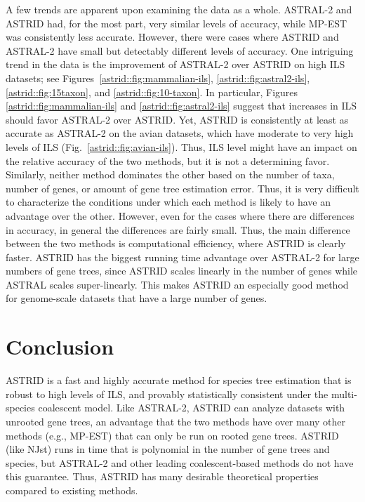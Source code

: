 A few trends are apparent upon examining the data as a whole. ASTRAL-2 
and ASTRID had, for the most part, very similar levels of accuracy,
while MP-EST was consistently less accurate.  However, there were cases 
where ASTRID and ASTRAL-2 have small but detectably different levels of
accuracy.
One intriguing trend in the data is the improvement of
ASTRAL-2 over ASTRID on high ILS datasets; see Figures~\ref{astrid::fig:mammalian-ils},
\ref{astrid::fig:astral2-ils}, \ref{astrid::fig:15taxon}, and \ref{astrid::fig:10-taxon}. 
In particular, Figures \ref{astrid::fig:mammalian-ils} and \ref{astrid::fig:astral2-ils} suggest
that increases in ILS should favor ASTRAL-2 over ASTRID. Yet, 
 ASTRID is consistently 
at least as accurate as ASTRAL-2 on the avian datasets, which
have moderate to very high levels of ILS (Fig.~\ref{astrid::fig:avian-ils}).
Thus, ILS level might have an impact on the relative accuracy of the
two methods, but it is not a determining favor.
Similarly, neither method
dominates the other based on the number of
taxa, number of genes, or amount of gene tree estimation error.
Thus, it is very difficult to characterize the conditions under which each method is
likely to have an advantage over the other.
However, even for
the cases where there are differences in accuracy, in general the differences
are fairly small. Thus, the main difference between the two methods 
is computational efficiency, where ASTRID is clearly faster. ASTRID
has the biggest running time advantage over ASTRAL-2 for large numbers
of gene trees, since ASTRID scales linearly in the number of genes
while ASTRAL scales super-linearly. This makes ASTRID an especially
good method for genome-scale datasets that have a large number of
genes.


\section{Conclusion}

ASTRID is a fast and highly accurate method for species tree
estimation that is robust to high levels of ILS, and provably
statistically consistent under the multi-species coalescent model.
Like ASTRAL-2, 
 ASTRID can analyze datasets with unrooted gene trees, an
advantage that the two methods have over many other methods (e.g.,
MP-EST) that can only be run on rooted gene trees.  
ASTRID (like NJst) runs in time that is polynomial in the number of gene
trees and species, but ASTRAL-2 
 and other leading coalescent-based
methods do not have this guarantee.  Thus, ASTRID has many desirable
theoretical properties compared to existing methods.

